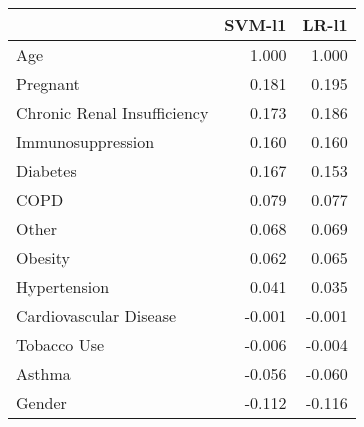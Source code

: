 \begin{tabular}{lrr}
\toprule
{} &  SVM-l1 &  LR-l1 \\
\midrule
Age                         &   1.000 &  1.000 \\
Pregnant                    &   0.181 &  0.195 \\
Chronic Renal Insufficiency &   0.173 &  0.186 \\
Immunosuppression           &   0.160 &  0.160 \\
Diabetes                    &   0.167 &  0.153 \\
COPD                        &   0.079 &  0.077 \\
Other                       &   0.068 &  0.069 \\
Obesity                     &   0.062 &  0.065 \\
Hypertension                &   0.041 &  0.035 \\
Cardiovascular Disease      &  -0.001 & -0.001 \\
Tobacco Use                 &  -0.006 & -0.004 \\
Asthma                      &  -0.056 & -0.060 \\
Gender                      &  -0.112 & -0.116 \\
\bottomrule
\end{tabular}
